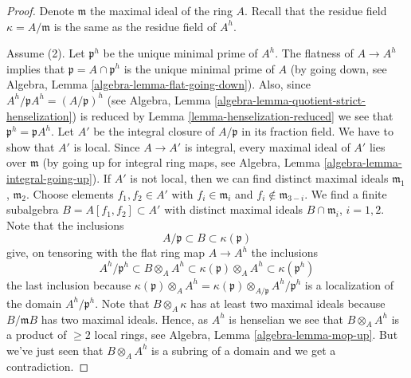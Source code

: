 \begin{proof}
Denote $\mathfrak m$ the maximal ideal of the ring $A$.
Recall that the residue field $\kappa = A/\mathfrak m$ is the same as
the residue field of $A^h$.

\medskip\noindent
Assume (2). Let $\mathfrak p^h$ be the unique minimal prime of
$A^h$. The flatness of $A \to A^h$ implies that
$\mathfrak p = A \cap \mathfrak p^h$ is the unique minimal
prime of $A$ (by going down, see
Algebra, Lemma \ref{algebra-lemma-flat-going-down}).
Also, since $A^h/\mathfrak pA^h = (A/\mathfrak p)^h$ (see
Algebra, Lemma \ref{algebra-lemma-quotient-strict-henselization})
is reduced by Lemma \ref{lemma-henselization-reduced}
we see that $\mathfrak p^h = \mathfrak pA^h$.
Let $A'$ be the integral closure of $A/\mathfrak p$ in its fraction
field. We have to show that $A'$ is local.
Since $A \to A'$ is integral, every maximal ideal of $A'$ lies over
$\mathfrak m$ (by going up for integral ring maps, see
Algebra, Lemma \ref{algebra-lemma-integral-going-up}).
If $A'$ is not local, then we can find distinct maximal ideals
$\mathfrak m_1$, $\mathfrak m_2$. Choose elements $f_1, f_2 \in A'$
with $f_i \in \mathfrak m_i$ and $f_i \not \in \mathfrak m_{3 - i}$.
We find a finite subalgebra $B = A[f_1, f_2] \subset A'$ with distinct maximal
ideals $B \cap \mathfrak m_i$, $i = 1, 2$.
Note that the inclusions
$$
A/\mathfrak p \subset B \subset \kappa(\mathfrak p)
$$
give, on tensoring with the flat ring map $A \to A^h$ the inclusions
$$
A^h/\mathfrak p^h \subset
B \otimes_A A^h \subset
\kappa(\mathfrak p) \otimes_A A^h \subset
\kappa(\mathfrak p^h)
$$
the last inclusion because
$\kappa(\mathfrak p) \otimes_A A^h =
\kappa(\mathfrak p) \otimes_{A/\mathfrak p} A^h/\mathfrak p^h$
is a localization of the domain $A^h/\mathfrak p^h$.
Note that $B \otimes_A \kappa$ has at least two maximal ideals
because $B/\mathfrak mB$ has two maximal ideals. Hence, as
$A^h$ is henselian we see that
$B \otimes_A A^h$ is a product of $\geq 2$ local rings, see
Algebra, Lemma \ref{algebra-lemma-mop-up}.
But we've just seen that $B \otimes_A A^h$ is a subring of a domain
and we get a contradiction.


\end{proof}
